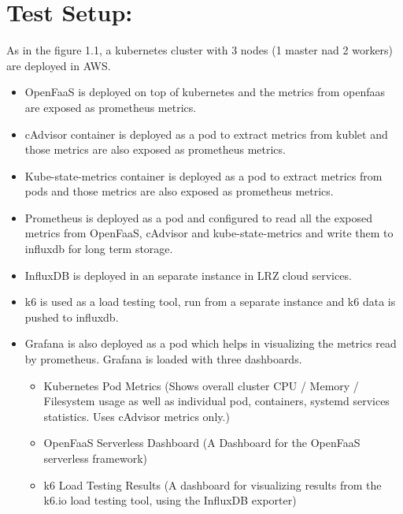 \section{Test Setup:}

As in the figure 1.1, a kubernetes cluster with 3 nodes (1 master nad 2 workers) are deployed in AWS.
\begin{itemize}
    \item OpenFaaS is deployed on top of kubernetes and the metrics from openfaas are exposed as prometheus metrics.
    \item cAdvisor container is deployed as a pod to extract metrics from kublet and those metrics are also exposed as prometheus metrics.
    \item Kube-state-metrics container is deployed as a pod to extract metrics from pods and those metrics are also exposed as prometheus metrics.
    \item Prometheus is deployed as a pod and configured to read all the exposed metrics from OpenFaaS, cAdvisor and kube-state-metrics and write them to influxdb for long term storage.
    \item InfluxDB is deployed in an separate instance in LRZ cloud services. 
    \item k6 is used as a load testing tool, run from a separate instance and k6 data is pushed to influxdb.
    \item Grafana is also deployed as a pod which helps in visualizing the metrics read by prometheus. Grafana is loaded with three dashboards.
    \begin{itemize}
        \item Kubernetes Pod Metrics (Shows overall cluster CPU / Memory / Filesystem usage as well as individual pod, containers, systemd services statistics. Uses cAdvisor metrics only.)
        \item OpenFaaS Serverless Dashboard (A Dashboard for the OpenFaaS serverless framework)
        \item k6 Load Testing Results (A dashboard for visualizing results from the k6.io load testing tool, using the InfluxDB exporter)
    \end{itemize}
\end{itemize}

